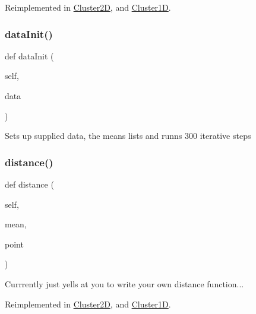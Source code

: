 Reimplemented in \mbox{\hyperlink{classdynamicfilterapp_1_1simulation__files_1_1cluster_1_1_cluster2_d_aac77177976d5d302c5b583d66aec9275}{Cluster2D}}, and \mbox{\hyperlink{classdynamicfilterapp_1_1simulation__files_1_1cluster_1_1_cluster1_d_aac77177976d5d302c5b583d66aec9275}{Cluster1D}}.

\mbox{\label{classdynamicfilterapp_1_1simulation__files_1_1cluster_1_1_clusterk_d_ab1f8724caffbb08273d6b95ffcee9390}} 
\subsubsection{\texorpdfstring{dataInit()}{dataInit()}}
{\footnotesize\ttfamily def data\+Init (\begin{DoxyParamCaption}\item[{}]{self,  }\item[{}]{data }\end{DoxyParamCaption})}

\begin{DoxyVerb}Sets up supplied data, the means lists and runns 300 iterative steps
\end{DoxyVerb}
 \mbox{\label{classdynamicfilterapp_1_1simulation__files_1_1cluster_1_1_clusterk_d_a52f9d99950e63d5a8748e36e2ccfd48a}} 
\subsubsection{\texorpdfstring{distance()}{distance()}}
{\footnotesize\ttfamily def distance (\begin{DoxyParamCaption}\item[{}]{self,  }\item[{}]{mean,  }\item[{}]{point }\end{DoxyParamCaption})}

\begin{DoxyVerb}Currrently just yells at you to write your own distance function...
\end{DoxyVerb}
 

Reimplemented in \mbox{\hyperlink{classdynamicfilterapp_1_1simulation__files_1_1cluster_1_1_cluster2_d_a52f9d99950e63d5a8748e36e2ccfd48a}{Cluster2D}}, and \mbox{\hyperlink{classdynamicfilterapp_1_1simulation__files_1_1cluster_1_1_cluster1_d_a52f9d99950e63d5a8748e36e2ccfd48a}{Cluster1D}}.

